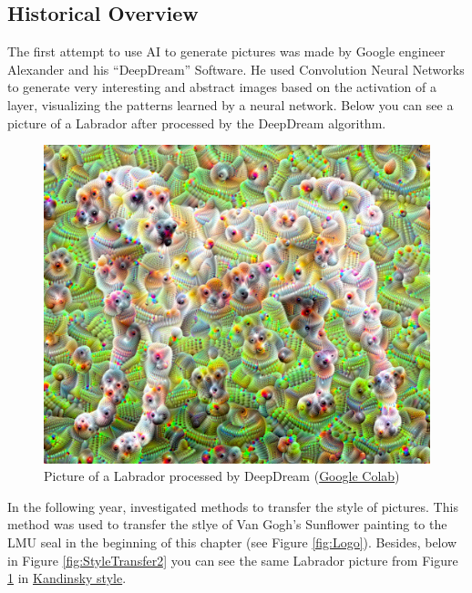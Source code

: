 \documentclass[
]{krantz}
\begin{document}
\hypertarget{historical-overview}{%
\subsection{Historical Overview}\label{historical-overview}}

The first attempt to use AI to generate pictures was made by Google engineer Alexander \citet{mordvintsev_2015} and his ``DeepDream'' Software. He used Convolution Neural Networks to generate very interesting and abstract images based on the activation of a layer, visualizing the patterns learned by a neural network. Below you can see a picture of a Labrador after processed by the DeepDream algorithm.

\begin{figure}

{\centering \includegraphics[width=0.5\linewidth]{./figures/03-chapter3/DeepDream} 

}

\caption{Picture of a Labrador processed by DeepDream (\href{https://www.tensorflow.org/tutorials/generative/deepdream}{Google Colab})}\label{fig:DeepDream}
\end{figure}



In the following year, \citet{StyleTransfer} investigated methods to transfer the style of pictures. This method was used to transfer the stlye of Van Gogh's Sunflower painting to the LMU seal in the beginning of this chapter (see Figure \ref{fig:Logo}). Besides, below in Figure \ref{fig:StyleTransfer2} you can see the same Labrador picture from Figure \ref{fig:DeepDream} in \href{https://storage.googleapis.com/download.tensorflow.org/example_images/Vassily_Kandinsky\%2C_1913_-_Composition_7.jpg}{Kandinsky style}.
\end{document}
